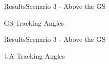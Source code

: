 \begin{frame}{Results}{Scenario 3 - Above the GS}
\begin{block}{GS Tracking Angles}
  \end{block}

\end{frame}



\begin{frame}{Results}{Scenario 3 - Above the GS}

  \begin{block}{UA Tracking Angles}  
  
  \begin{figure}[H]
    \centerline{
    \hfill
    }
\end{figure}
\end{block}
\end{frame}
